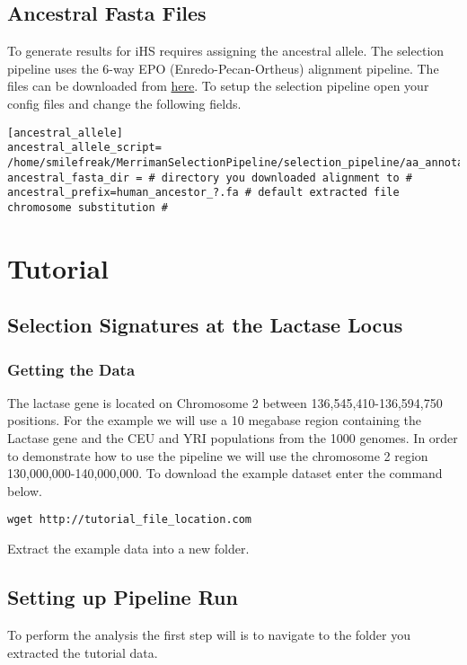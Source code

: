 \documentclass[a4paper,10pt]{article}
\begin{document}
\subsection{Ancestral Fasta Files}
To generate results for iHS requires assigning the ancestral allele. The selection pipeline uses the 6-way EPO (Enredo-Pecan-Ortheus) alignment pipeline. The files can be downloaded from \href{ftp://ftp.1000genomes.ebi.ac.uk/vol1/ftp/phase1/analysis_results/supporting/ancestral_alignments/human_ancestor_GRCh37_e59.tar.bz2}{here}. To setup the selection pipeline 
open your config files and change the following fields.\\
\begin{verbatim}
[ancestral_allele]
ancestral_allele_script= /home/smilefreak/MerrimanSelectionPipeline/selection_pipeline/aa_annotate.py
ancestral_fasta_dir = # directory you downloaded alignment to #
ancestral_prefix=human_ancestor_?.fa # default extracted file chromosome substitution #
\end{verbatim}
\section{Tutorial}
\subsection{Selection Signatures at the Lactase Locus}
\subsubsection{Getting the Data}
The lactase gene is located on Chromosome 2 between 136,545,410-136,594,750 positions. For the example we will use a 10 megabase region containing the Lactase gene and the CEU and YRI populations from the 1000 genomes. In order to demonstrate how to use the pipeline we will use the chromosome 2 region 130,000,000-140,000,000. To download the example dataset enter the command below. \\

\begin{verbatim}
wget http://tutorial_file_location.com 
\end{verbatim}

Extract the example data into a new folder.

\subsection{Setting up Pipeline Run}
To perform the analysis the first step will is to navigate to the folder you extracted the tutorial data.
\end{document}
